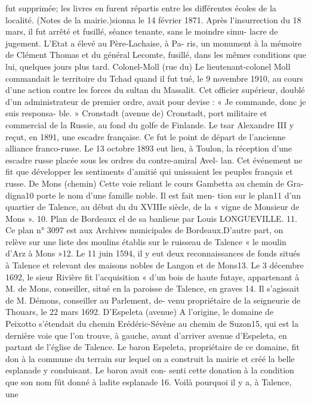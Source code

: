 \documentclass[a4paper,11pt]{book}
\begin{document}
fut supprimée; les livres en furent répartis entre les différentes écoles de
la localité. (Notes de la mairie.)sionna le 14 février 1871. Après l'insurrection du 18 mars,
il fut arrêté et fusillé, séance tenante, sans le moindre simu-
lacre de jugement. L'Etat a élevé au Père-Lachaise, à Pa-
ris, un monument à la mémoire de Clément Thomas et du
général Lecomte, fusillé, dans les mêmes conditions que
lui, quelques jours plus tard.
Colonel-Moll (rue du)
Le lieutenant-colonel Moll commandait le territoire du
Tchad quand il fut tué, le 9 novembre 1910, au cours d'une
action contre les forces du sultan du Massalit. Cet officier
supérieur, doublé d'un administrateur de premier ordre,
avait pour devise : « Je commande, donc je suis responsa-
ble. »
Cronstadt (avenue de)
Cronstadt, port militaire et commercial de la Russie, au
fond du golfe de Finlande. Le tsar Alexandre III y reçut,
en 1891, une escadre française. Ce fut le point de départ
de l'ancienne alliance franco-russe.
Le 13 octobre 1893 eut lieu, à Toulon, la réception d'une
escadre russe placée sous les ordres du contre-amiral Avel-
lan. Cet événement ne fit que développer les sentiments
d'amitié qui unissaient les peuples français et russe.
De Mons (chemin)
Cette voie reliant le cours Gambetta au chemin de Gra-
digna10 porte le nom d'une famille noble. Il est fait men-
tion sur le plan11 d'un quartier de Talence, au début du
du XVIIIe siècle, de la « vigne de Monsieur de Mons ».
10. Plan de Bordeaux el de sa banlieue par Louis LONGUEVILLE.
11. Ce plan n° 3097 est aux Archives municipales de Bordeaux.D'autre part, on relève sur une liste des moulins établis
sur le ruisseau de Talence « le moulin d'Arz à Mons »12.
Le 11 juin 1594, il y eut deux reconnaissances de fonds
situés à Talence et relevant des maisons nobles de Langon
et de Mons13.
Le 3 décembre 1692, le sieur Rivière fit l'acquisition
« d'un bois de haute futaye, appartenant à M. de Mons,
conseiller, situé en la paroisse de Talence, en graves 14.
Il s'agissait de M. Démons, conseiller au Parlement, de-
venu propriétaire de la seigneurie de Thouars, le 22 mars
1692.
D'Espeleta (avenue)
A l'origine, le domaine de Peixotto s'étendait du chemin
Erédéric-Sévène au chemin de Suzon15, qui est la dernière
voie que l'on trouve, à gauche, avant d'arriver avenue
d'Espeleta, en partant de l'église de Talence.
Le baron Espeleta, propriétaire de ce domaine, fit don
à la commune du terrain sur lequel on a construit la mairie
et créé la belle esplanade y conduisant. Le baron avait con-
senti cette donation à la condition que son nom fût donné
à ladite esplanade 16. Voilà pourquoi il y a, à Talence, une
\end{document}
